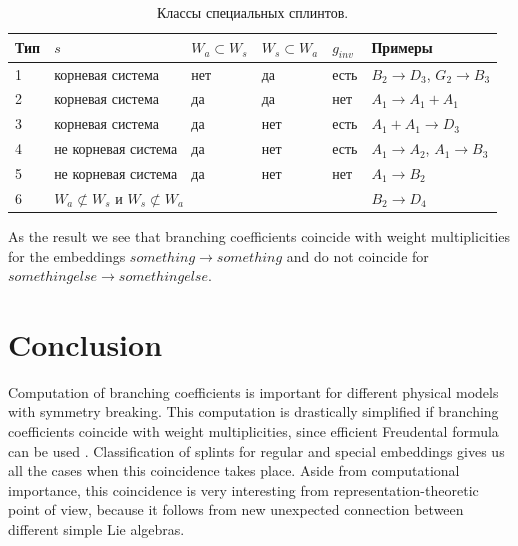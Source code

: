 \documentclass{article}
\begin{document}
\begin{table}[h]
\begin{tabular}[t]{|p{2em}|p{6em}|p{5em}|p{5em}|p{2em}|p{6em}|}
\hline
Тип & $s$ & $W_a\subset W_s$ & $W_s\subset W_a$ & $g_{inv} $ & Примеры \\
\hline
1 & корневая система & нет & да & есть  & $B_2\rightarrow D_3$, $G_2\rightarrow B_3$\\
\hline
2 & корневая система  & да & да & нет & $A_1\rightarrow A_1+A_1$ \\
\hline
3 & корневая система  & да & нет & есть & $A_1+A_1\rightarrow D_3$ \\
\hline
4 & не корневая система  & да & нет & есть & $A_1\rightarrow A_2$, $A_1\rightarrow B_3$\\
\hline
5 & не корневая система  & да & нет & нет  & $A_1\rightarrow B_2$\\
\hline
6 & \multicolumn{4}{|l|}{$W_a\not\subset W_s$ и $W_s\not\subset W_a$} & $B_2\rightarrow D_4$\\
\hline
\end{tabular}
\caption{Классы специальных сплинтов.}
\label {spsp}
\end{table}

As the result we see that branching coefficients coincide with weight multiplicities for
the embeddings $something\to something$ and do not coincide for $something else\to something else$. 

\section*{Conclusion}
\label{sec:conclusion}

Computation of branching coefficients is important for different physical models with symmetry
breaking. This computation is drastically simplified if branching coefficients coincide with weight
multiplicities, since efficient Freudental formula can be used \cite{moody1982fast}. Classification
of splints for regular and special embeddings gives us all the cases when this coincidence takes
place. Aside from computational importance, this coincidence is very interesting from
representation-theoretic point of view, because it follows from new unexpected connection between
different simple Lie algebras. 

{} 

\end{document}
